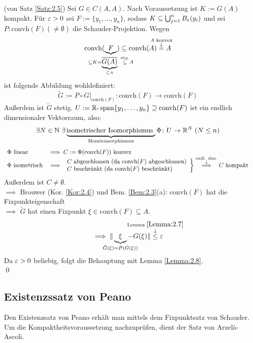 \documentclass[a4paper]{article}
\begin{document}
\begin{Beweis}
(von Satz \ref{Satz:2.5}) Sei $G\in C(A,A)$. Nach Voraussetzung ist $K:=\overline{G(A)}$ kompakt. Für $\operatorname{\varepsilon}>0$ sei $F:=\{y_1,\ldots,y_n\}$, sodass $K\subseteq \bigcup_{j=1}^nB_{\operatorname{\varepsilon}}(y_i)$ und sei $P\colon \mathrm{convh}(F)(\ne\emptyset)$ die Schauder-Projektion. Wegen
\[\mathrm{convh}(\underbrace{F}_{
\mathclap{
\subseteq K=\underbrace{\overline{G(A)}}_{\subseteq A}\;\;\overset{\text{abg.}}{\subseteq}A
}})\subseteq \mathrm{convh}(A)\overset{\mathclap{\substack{A\text{ konvex}\\\downarrow}}}{=}A\]
ist folgende Abbildung wohldefiniert:
\[\tilde{G}:=P\circ G|_{\mathrm{convh}(F)}\colon \mathrm{convh}(F)\to\mathrm{convh}(F)\]
Außerdem ist $\tilde{G}$ stetig. $U:=\mathbb R\text{-}\operatorname{\mathrm{span}}\{y_1,\ldots,y_n\}\supseteq \mathrm{convh}(F)$ ist ein endlich dimensionaler Vektorraum, also: 
\[\exists N\in\operatorname{\mathbb N}\,\exists \underbrace{\text{isometrischer Isomorphismus }}_{\text{Homöomorphismus}}\Phi\colon U\to\mathbb R^N\;(N\le n)\]
\[\begin{array}{ll}
\Phi\text{ linear}&\implies C:=\Phi(\mathrm{convh}(F))\text{ konvex}\\
\Phi\text{ isometrisch}&\implies \left.\begin{array}{l}
C\text{ abgeschlossen (da $\mathrm{convh}(F)$ abgeschlossen)}\\
C\text{ beschränkt (da $\mathrm{convh}(F)$ beschränkt)}
\end{array}\right\}\overset{\substack{\text{endl. dim.}\\\downarrow}}{\implies} C\text{ kompakt}
\end{array}\]
Außerdem ist $C\ne \emptyset$.\\
$\implies$ Brouwer (Kor. \ref{Kor:2.4}) und Bem. \ref{Bem:2.3}(a): $\mathrm{convh}(F)$ hat die Fixpunkteigenschaft\\
$\implies$ $\tilde{G}$ hat einen Fixpunkt $\xi\in \mathrm{convh}(F)\subseteq A$.
\[\implies \|\underbrace{\xi}_{\mathclap{\tilde{G}(\xi)=P(G(\xi))}}-G(\xi)\|\overset{\mathclap{\substack{\text{Lemma }\ref{Lemma:2.7}\\ \downarrow}}}{\le}\ve\]
Da $\operatorname{\varepsilon}>0$ beliebig, folgt die Behauptung mit Lemma \ref{Lemma:2.8}.\\\qed
\end{Beweis}

\subsection{Existenzssatz von Peano}
Den Existenzsatz von Peano erhält man mittels dem Fixpunktsatz von Schauder. Um die Kompaktheitsvoraussetzung nachzuprüfen, dient der Satz von Arzel\`a-Ascoli.
\end{document}
